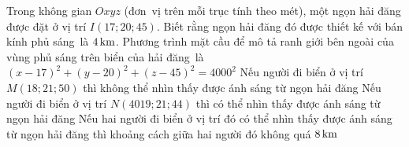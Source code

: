 \begin{ex}%
	Trong không gian $Oxyz$  (đơn~vị trên mỗi trục tính theo mét), một ngọn hải đăng được đặt ở vị trí $I(17;20;45)$. Biết rằng ngọn hải đăng đó được thiết kế với bán kính phủ sáng~là $4\rm\,km$.
	 \choiceTF
		{\True Phương trình mặt cầu để mô tả  ranh giới bên ngoài của vùng phủ sáng trên biển của hải đăng~là $(x-17)^2+(y-20)^2+(z-45)^2=4000^2$}
		{Nếu người đi biển ở vị  trí $M(18;21;50)$ thì không thể nhìn thấy được ánh sáng từ ngọn hải đăng}
		{Nếu người đi biển ở vị trí $N(4019;21;44)$ thì có thể nhìn thấy được  ánh sáng từ ngọn hải đăng}
		{\True Nếu hai người đi biển ở vị trí đó có thể nhìn thấy được ánh sáng từ ngọn hải đăng thì khoảng cách giữa hai người đó không  quá $8\rm\,km$}
\end{ex}

